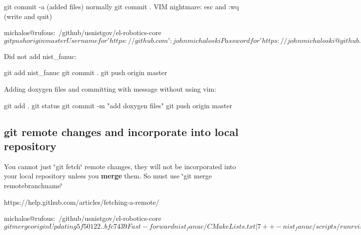 git commit -\/a (added files) normally git commit . V\-I\-M nightmare\-: esc and \-:wq (write and quit)

\begin{DoxyVerb}michalos@rufous:~/github/usnistgov/el-robotics-core$ git push origin master
Username for 'https://github.com': johnmichaloski
Password for 'https://johnmichaloski@github.com': 
Counting objects: 10, done.
Delta compression using up to 8 threads.
Compressing objects: 100%
Writing objects: 100%
Total 2 (delta 1), reused 0 (delta 0)
To https://github.com/usnistgov/el-robotics-core
   395d561..b74a274  master -> master
michalos@rufous:~/github/usnistgov/el-robotics-core$ 
\end{DoxyVerb}


Did not add nist\-\_\-fanuc\-: \begin{DoxyVerb}git add nist_fanuc
git commit .
git push origin master
\end{DoxyVerb}


Adding doxygen files and committing with message without using vim\-: \begin{DoxyVerb}git add .
git status
git commit -m "add doxygen files"
git push origin master
\end{DoxyVerb}


\subsection*{git remote changes and incorporate into local repository }

You cannot just \char`\"{}git fetch\char`\"{} remote changes, they will not be incorporated into your local repository unless you {\bfseries merge} them. So must use \char`\"{}git merge remotebranchname\char`\"{} \begin{DoxyVerb}https://help.github.com/articles/fetching-a-remote/

michalos@rufous:~/github/usnistgov/el-robotics-core$ git merge origin
Updating 5f50122..bfc7439
Fast-forward
 nist_fanuc/CMakeLists.txt           |   7 ++-
 nist_fanuc/scripts/runrvizdemo.bash |   2 +-
 nist_kitting/src/move_group.cpp     |  59 +------------------
 nist_kitting/src/mover.cpp          | 111 ++++--------------------------------
 ulapi/package.xml                   |   2 +-
 5 files changed, 20 insertions(+), 161 deletions(-)
michalos@rufous:~/github/usnistgov/el-robotics-core$ \end{DoxyVerb}
 